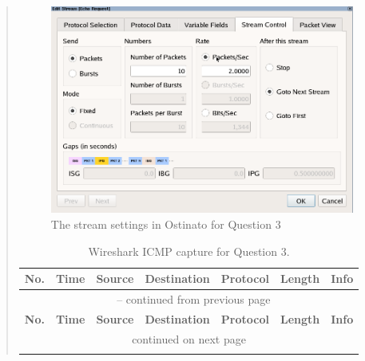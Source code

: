 \documentclass{article}
\newenvironment{ans}
   {\fbox{Answer}\begin{quote}}
   {\end{quote}}
\begin{document}
\begin{ans}
\begin{figure}[H]
   \centering
   \includegraphics[width=10cm]{data/q3-stream-settings.png}
   \caption{The stream settings in Ostinato for Question 3}
   \label{fig:stream-settings-q3}
\end{figure}

\begin{center}
\begin{longtable}{|l|l|l|l|l|l|p{10em}|}
\caption{Wireshark ICMP capture for Question 3.}
\label{longtable:wireshark-cap-q3}\\
\hline 
\multicolumn{1}{|c|}{\textbf{No.}}&
\multicolumn{1}{c|}{\textbf{Time}}&
\multicolumn{1}{c|}{\textbf{Source}}&
\multicolumn{1}{c|}{\textbf{Destination}}&
\multicolumn{1}{c|}{\textbf{Protocol}}&
\multicolumn{1}{c|}{\textbf{Length}}&
\multicolumn{1}{c|}{\textbf{Info}}\\
\hline 
\endfirsthead

\multicolumn{7}{c}{\tablename\ \thetable{} -- continued from previous page}\\
\hline
\multicolumn{1}{|c|}{\textbf{No.}}&
\multicolumn{1}{c|}{\textbf{Time}}&
\multicolumn{1}{c|}{\textbf{Source}}&
\multicolumn{1}{c|}{\textbf{Destination}}&
\multicolumn{1}{c|}{\textbf{Protocol}}&
\multicolumn{1}{c|}{\textbf{Length}}&
\multicolumn{1}{c|}{\textbf{Info}}\\
\hline 
\endhead

\hline
\multicolumn{7}{|c|}{{continued on next page}}\\
\hline
\endfoot

\hline
\hline
\endlastfoot


\end{longtable}
\end{center}
\end{ans}
\end{document}
